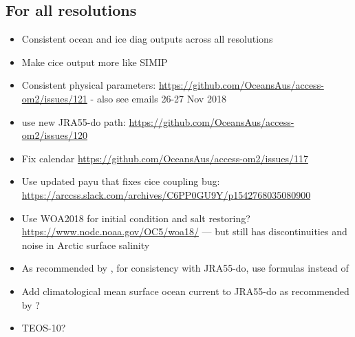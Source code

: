 \documentclass[11pt]{article}
\begin{document}
\subsection{For all resolutions}
\begin{itemize}
\item Consistent ocean and ice diag outputs across all resolutions
\item Make cice output more like SIMIP \citep{NotzJahnHollandHunkeMassonnetStroeveTremblayVancoppenolle2016a}
\item Consistent physical parameters: \url{https://github.com/OceansAus/access-om2/issues/121} - also see emails 26-27 Nov 2018
\item use new JRA55-do path: \url{https://github.com/OceansAus/access-om2/issues/120}
\item Fix calendar \url{https://github.com/OceansAus/access-om2/issues/117}
\item Use updated payu that fixes cice coupling bug: \url{https://arccss.slack.com/archives/C6PP0GU9Y/p1542768035080900}
\item Use WOA2018 for initial condition and salt restoring? \url{https://www.nodc.noaa.gov/OC5/woa18/} --- but still has discontinuities and noise in Arctic surface salinity
\item As recommended by \citet{TsujinoETAL2018a}, for consistency with JRA55-do, use \citet{Gill82a} formulas instead of \citet{LargeYeager2004a,LargeYeager2009a}
\item Add climatological mean surface ocean current to JRA55-do as recommended by \citet{TsujinoETAL2018a}?
\item TEOS-10?
\end{itemize}
\end{document}
